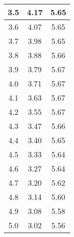 \begin{tabular}{|c|c|c|}
3.5			& 4.17		& 5.65 \\ \hline
3.6			& 4.07		& 5.65 \\ \hline
3.7			& 3.98		& 5.65 \\ \hline
3.8			& 3.88		& 5.66 \\ \hline
3.9			& 3.79		& 5.67 \\ \hline
4.0			& 3.71		& 5.67 \\ \hline
4.1			& 3.63		& 5.67 \\ \hline
4.2			& 3.55		& 5.67 \\ \hline
4.3			& 3.47		& 5.66 \\ \hline
4.4			& 3.40		& 5.65 \\ \hline
4.5			& 3.33		& 5.64 \\ \hline
4.6			& 3.27		& 5.64 \\ \hline
4.7			& 3.20		& 5.62 \\ \hline
4.8			& 3.14		& 5.60 \\ \hline
4.9			& 3.08		& 5.58 \\ \hline
5.0			& 3.02		& 5.56 \\ \hline
\end{tabular}
